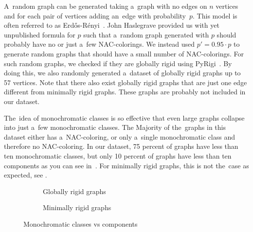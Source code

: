 A~random graph can be generated taking a~graph with no edges on \( n \) vertices
and for each pair of vertices adding an~edge with probability~\( p \).
This model is often referred to as Erdős-Rényi~\cite{random_gnp}.
%
John Haslegrave provided us with yet unpublished formula for \( p \)
such that a~random graph generated with \( p \)
should probably have no or just a~few NAC-colorings.
%
We instead used \( p' = 0.95\cdot p \) to generate random graphs that
should have a small number of NAC-colorings.
For such random graphs, we checked if they are globally rigid using PyRigi~\cite{pyrigi}.
%
By doing this, we also randomly generated a~dataset of globally rigid graphs
up to 57 vertices.
%
Note that there also exist globally rigid graphs
that are just one edge different from minimally rigid graphs.
These graphs are probably not included in our dataset.

The~idea of monochromatic classes is so effective
that even large graphs collapse into just a~few monochromatic classes.
The Majority of the~graphs in this dataset either has a~NAC-coloring,
or only a~single monochromatic class and therefore no NAC-coloring.
In our dataset, 75 percent of graphs have less than ten	monochromatic classes,
but only 10 percent of graphs have less than ten \trcon{} components
as you can see in~.
For minimally rigid graphs, this is not the~case as expected, see
.
%
\begin{figure}[h!]
	\centering
	\begin{subfigure}{0.48\textwidth}
		\centering
		\scalebox{0.6}{}
		\caption[Monoch. classes vs tr. con. components for globally rigid]{%
			\centering Globally rigid graphs}%
		\label{fig:monochrom_vs_triangle_globally_rigid}
	\end{subfigure}
	\hfill
	\begin{subfigure}{0.48\textwidth}
		\centering
		\scalebox{0.6}{}
		\caption[Monoch. classes vs tr. con. components for minimally rigid]{%
			\centering Minimally rigid graphs}%
		\label{fig:monochrom_vs_triangle_minimally_rigid}
	\end{subfigure}
	\caption{Monochromatic classes vs \trcon{} components}%
	\label{fig:monochrom_vs_triangle}
\end{figure}

